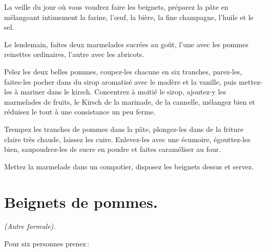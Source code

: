 La veille du jour où vous voudrez faire les beignets, préparez la pâte en
mélangeant intimement la farine, l'œuf, la bière, la fine champagne, l'huile et
le sel.

Le lendemain, faites deux marmelades sucrées au goût, l'une avec les pommes
reinettes ordinaires, l'autre avec les abricots.

Pelez les deux belles pommes, coupez-les chacune en six tranches, parez-les,
faites-les pocher dans du sirop aromatisé avec le madère et la vanille, puis
mettez-les à mariner dans le kirsch. Concentrez à moitié le sirop, ajoutez-y
les marmelades de fruits, le Kirsch de la marinade, de la cannelle, mélangez
bien et réduisez le tout à une consistance un peu ferme.

Trempez les tranches de pommes dans la pâte, plongez-les dans de la friture
claire très chaude, laissez les cuire. Enlevez-les avec une écumoire,
égouttez-les bien, saupoudrez-les de sucre en poudre et faites caraméliser au
four.

Mettez la marmelade dans un compotier, disposez les beignets dessus et servez.

\section*{\centering Beignets de pommes.}
{}

\begin{center}
\textit{(Autre formule).}
\end{center}

Pour six personnes prenez :

